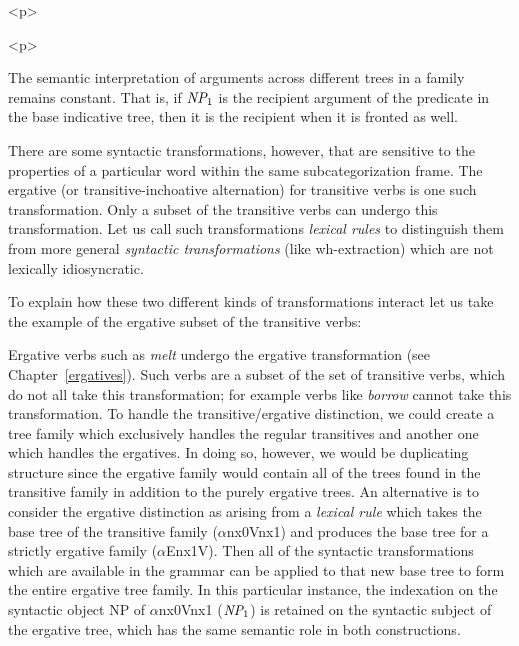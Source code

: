 \begin{rawhtml} <p> \end{rawhtml}
\centering 
\mbox{} 
\begin{rawhtml} <dl> <dt>{Transitive tree with object extraction: $\alpha$W1nx0Vnx1 <p> </dl> \end{rawhtml}
\label{trans-extracted-tree} 
\begin{rawhtml} <p> \end{rawhtml}
 
The semantic interpretation of arguments across different trees in a 
family remains constant.  That is, if $\mbox{\em NP}_1$ is the 
recipient argument of the predicate in the base indicative tree, then 
it is the recipient when it is fronted as well. 
 
There are some syntactic transformations, however, that are sensitive to the 
properties of a particular word within the same subcategorization frame. The 
ergative (or transitive-inchoative alternation) for transitive verbs is one 
such transformation. Only a subset of the transitive verbs can undergo this 
transformation. Let us call such transformations {\em lexical rules} to 
distinguish them from more general {\em syntactic transformations} (like 
wh-extraction) which are not lexically idiosyncratic. 
 
To explain how these two different kinds of transformations interact 
let us take the example of the ergative subset of the transitive 
verbs: 
 
Ergative verbs such as {\it melt} undergo the ergative transformation (see 
Chapter~\ref{ergatives}). Such verbs are a subset of the set of transitive 
verbs, which do not all take this transformation; for example verbs like {\it borrow} cannot take this transformation. To handle the transitive/ergative 
distinction, we could create a tree family which exclusively handles the 
regular transitives and another one which handles the ergatives.  In doing so, 
however, we would be duplicating structure since the ergative family would 
contain all of the trees found in the transitive family in addition to the 
purely ergative trees.  An alternative is to consider the ergative distinction 
as arising from a {\em lexical rule} which takes the base tree of the 
transitive family ($\alpha$nx0Vnx1) and produces the base tree for a strictly 
ergative family ($\alpha$Enx1V).  Then all of the syntactic transformations 
which are available in the grammar can be applied to that new base tree to form 
the entire ergative tree family.  In this particular instance, the indexation 
on the syntactic object NP of $\alpha$nx0Vnx1 ($\mbox{\em NP}_1$) is retained 
on the syntactic subject of the ergative tree, which has the same semantic role 
in both constructions. 
 
